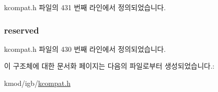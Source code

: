 kcompat.\+h 파일의 431 번째 라인에서 정의되었습니다.

\subsubsection[{\texorpdfstring{reserved}{reserved}}]{ reserved}\hypertarget{structethtool__test_ac429abb4d17158f1d4b8390ae6a1ee8f}{}\label{structethtool__test_ac429abb4d17158f1d4b8390ae6a1ee8f}


kcompat.\+h 파일의 430 번째 라인에서 정의되었습니다.



이 구조체에 대한 문서화 페이지는 다음의 파일로부터 생성되었습니다.\+:\begin{DoxyCompactItemize}
\item 
kmod/igb/\hyperlink{kcompat_8h}{kcompat.\+h}\end{DoxyCompactItemize}
